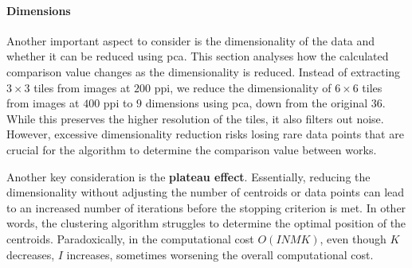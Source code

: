 \begin{toReview}
	\paragraph{Dimensions} Another important aspect to consider is the dimensionality of the data and whether it can be reduced using \gls{pca}. This section analyses how the calculated comparison value changes as the dimensionality is reduced. Instead of extracting $3\times3$ tiles from images at $200$ \gls{ppi}, we reduce the dimensionality of $6\times6$ tiles from images at $400$ \gls{ppi} to $9$ dimensions using \gls{pca}, down from the original $36$. While this preserves the higher resolution of the tiles, it also filters out noise. However, excessive dimensionality reduction risks losing rare data points that are crucial for the algorithm to determine the comparison value between works.

	\noindent Another key consideration is the \textbf{plateau effect}. Essentially, reducing the dimensionality without adjusting the number of centroids or data points can lead to an increased number of iterations before the stopping criterion is met. In other words, the clustering algorithm struggles to determine the optimal position of the centroids. Paradoxically, in the computational cost $O(INMK)$, even though $K$ decreases, $I$ increases, sometimes worsening the overall computational cost.


\end{toReview}
